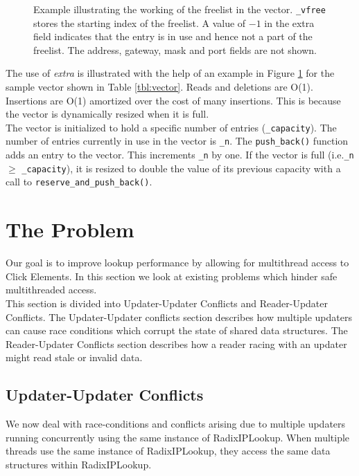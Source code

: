 \documentclass[a4paper,marginparwidth=50pt,marginparsep=10pt]{article}
\begin{document}
\begin{figure}[tph]
\begin{center}
\begin{tabular}{|p{2.5in} c|}
\hline
\end{tabular}
\cprotect\caption{Example illustrating the working of the freelist in the vector. \verb+_vfree+ stores the starting index of the freelist. A value of $-1$ in the extra field indicates that the entry is in use and hence not a part of the freelist. The address, gateway, mask and port fields are not shown.}
\label{fig:freelisteg}
\end{center}
\end{figure}


The use of \emph{extra} is illustrated with the help of an example in Figure \ref{fig:freelisteg} for the sample vector shown in Table \ref{tbl:vector}. Reads and deletions are O(1). Insertions are O(1) amortized over the cost of many insertions. This is because the vector is dynamically resized when it is full.\\

The vector is initialized to hold a specific number of entries (\verb+_capacity+). The number of entries currently in use in the vector is \verb+_n+. The \verb+push_back()+ function adds an entry to the vector. This increments \verb$_n$ by one. If the vector is full (i.e.\verb+_n+ $\ge$ \verb+_capacity+), it is resized to double the value of its previous capacity with a call to \verb+reserve_and_push_back()+.

\section{The Problem}
\label{sec:problem}
Our goal is to improve lookup performance by allowing for multithread access to Click Elements. In this section we look at existing problems which hinder safe multithreaded access.\\

This section is divided into Updater-Updater Conflicts and Reader-Updater Conflicts. The Updater-Updater conflicts section describes how multiple updaters can cause race conditions which corrupt the state of shared data structures. The Reader-Updater Conflicts section describes how a reader racing with an updater might read stale or invalid data.
\subsection{Updater-Updater Conflicts}
We now deal with race-conditions and conflicts arising due to multiple updaters running concurrently using the same instance of RadixIPLookup. When multiple threads use the same instance of RadixIPLookup, they access the same data structures within RadixIPLookup.
\end{document}
